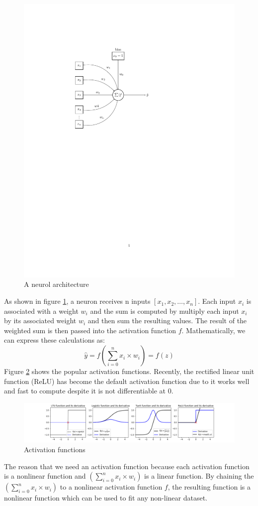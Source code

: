 \documentclass{article}
\begin{document}
\begin{figure}[h]
\centering
\includegraphics[width=.75\textwidth]{Neuron.pdf}	
\caption{A neurol architecture}
\label{fig:neuron}
\end{figure}

As shown in figure \ref{fig:neuron}, a neuron receives n inputs $[x_1,x_2, \dots, x_n]$. Each input $x_i$ is associated with a weight $w_i$ and the sum is computed by multiply each input $x_i$ by its associated weight $w_i$ and then sum the resulting values. The result of the weighted sum is then passed into the activation function $f$. Mathematically, we can express these calculations as:
\begin{equation} \label{neuronfunc}
\hat{y} = f\left(\sum_{i=0}^{n}x_i \times w_i\right) = f(z)
\end{equation}
Figure \ref{fig:actFuncs} shows the popular activation functions. Recently, the rectified linear unit function (ReLU) has become the default activation function due to it works well and fast to compute despite it is not differentiable at 0.
\begin{figure}[h]
\centering
\includegraphics[width=1.0\textwidth]{activationFuncs.png}
\caption{Activation functions}
\label{fig:actFuncs}
\end{figure}
The reason that we need an activation function because each activation function is a nonlinear function and $\left(\sum_{i=0}^{n}x_i \times w_i\right)$ is a linear function. By chaining the $\left(\sum_{i=0}^{n}x_i \times w_i\right)$ to a nonlinear activation function $f$, the resulting function is a nonlinear function which can be used to fit any non-linear dataset.
\end{document}
